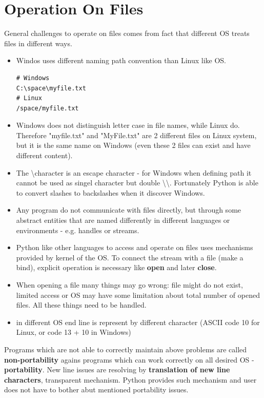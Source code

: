 \documentclass{article}
\begin{document}
\newpage
\section{Operation On Files}
General challenges to operate on files comes from fact that different OS treats files in different ways.
\begin{itemize}
\item Windos uses different naming path convention than Linux like OS.
\begin{lstlisting}[style=bash]
# Windows
C:\space\myfile.txt
# Linux
/space/myfile.txt
\end{lstlisting}
\item Windows does not distinguish letter case in file names, while Linux do. Therefore "myfile.txt" and "MyFile.txt" are 2 different files on Linux system, but it is the same name on Windows (even these 2 files can exist and have different content).
\item The \textbackslash character is an escape character - for Windows when defining path it cannot be used as singel character but double \textbackslash\textbackslash. Fortunately Python is able to convert slashes to backslashes when it discover Windows.
\item Any program do not communicate with files directly, but through some abstract entities that are named differently in different languages or environments - e.g. handles or streams.
\item Python like other languages to access and operate on files uses mechanisms provided by kernel of the OS. To connect the stream with a file (make a bind), explicit operation is necessary like \textbf{open} and later \textbf{close}.
\item When opening a file many things may go wrong: file might do not exist, limited access or OS may have some limitation about total number of opened files. All these things need to be handled.
\item in different OS end line is represent by different character (ASCII code 10 for Linux, or code 13 + 10 in Windows)
\end{itemize}
Programs which are not able to correctly maintain above problems are called \textbf{non-portability} agains programs which can work correctly on all desired OS - \textbf{portability}. New line issues are resolving by \textbf{translation of new line characters}, transparent mechanism. Python provides such mechanism and user does not have to bother abut mentioned portability issues.
\end{document}
